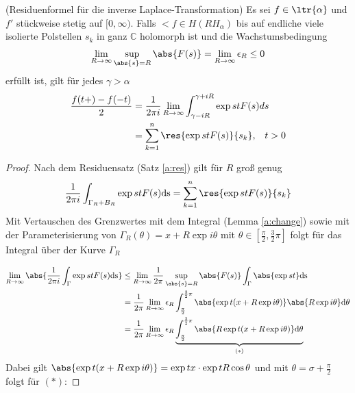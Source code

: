 \begin{satz}(Residuenformel für die inverse Laplace-Transformation)\label{lt:res}
Es sei $f \in \ltr{\alpha}$ und $f'$ stückweise stetig auf $[0, \infty)$. Falls $\lt{f} \in H(RH_{\alpha})$ bis auf endliche viele isolierte Polstellen $s_k$ in ganz $\mathbb{C}$  holomorph ist und die Wachstumsbedingung 
\begin{align}
	\lim_{R \rightarrow \infty} \sup_{\abs{s} = R} \abs{F(s)} = \lim_{R \rightarrow \infty} \epsilon_R \leq 0
\end{align}
erfüllt ist, gilt für jedes $\gamma > \alpha$
\begin{align}
	\frac{f(t+) - f(-t)}{2} &= \frac{1}{2 \pi i } \lim_{R \rightarrow \infty} \int_{\gamma - i R}^{\gamma+ i R} \exp{st} F(s) ds \\
	&= \sum_{k=1}^{n} \res{\exp{st} F(s)}{s_k} \text{,} \quad t > 0 
\end{align}
\begin{proof} 
Nach dem Residuensatz (Satz \ref{a:res}) gilt für $R$ groß genug
\begin{align}
	\frac{1}{2 \pi i}  \int_{\Gamma_R + B_R} \exp{st} F(s) \mathrm{ds} = \sum_{k=1}^n \res{\exp{st} F(s)}{s_k}
\end{align}
Mit Vertauschen des Grenzwertes mit dem Integral (Lemma \ref{a:change}) sowie mit der Parameterisierung von $\Gamma_R(\theta) = x + R \exp{i\theta}$ mit $\theta \in [\frac{\pi}{2}, \frac{3}{2} \pi]$ folgt für das Integral über der Kurve $\Gamma_R$\\
\begin{minipage}{0.69\textwidth}
\begin{align}
 \lim_{R \rightarrow \infty}{\abs{\frac{1}{2\pi i} \int_{\Gamma} \exp{st}F(s)\mathrm{ds}}} &\leq \lim_{R \rightarrow \infty}{ \frac{1}{2\pi}\sup_{\abs{s} = R}{\abs{F(s)}} \int_{\Gamma} \abs{\exp{st}} \mathrm{ds}}\\
 &=  \frac{1}{2\pi} \lim_{R \rightarrow \infty} \epsilon_R \int_{\frac{\pi}{2}}^{\frac{3}{2}\pi} \abs{\exp{t (x+R  \exp{i \theta })} } \abs{R \exp{i \theta}} \mathrm{d\theta}\\
&=  \frac{1}{2\pi} \lim_{R \rightarrow \infty} \epsilon_R \underbrace{\int_{\frac{\pi}{2}}^{\frac{3}{2}\pi} \abs{R \exp{t (x+R  \exp{i \theta })} } \mathrm{d\theta}}_{(*)}
\end{align} 
Dabei gilt $\abs{\exp{t (x + R \exp{i \theta})}} = \exp{tx} \cdot \exp{t R \cos{\theta}}$ und mit $\theta = \sigma + \frac{\pi}{2}$ folgt für $(*)$:
\end{minipage}
\begin{minipage}{0.36\textwidth}

\end{minipage}
\end{proof}
\end{satz}
